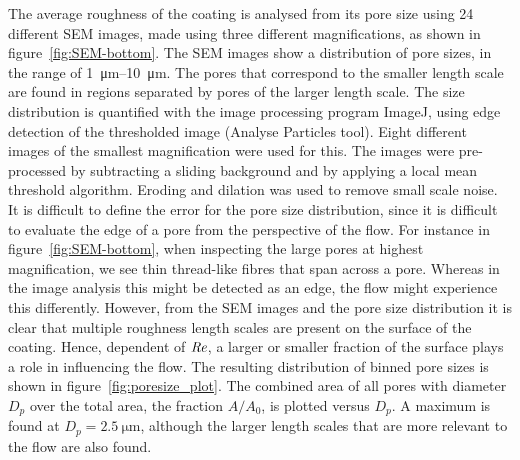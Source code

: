 The average roughness of the coating is analysed from its pore size using 24 different SEM images, made using three different magnifications, as shown in figure~\ref{fig:SEM-bottom}.  The SEM images show a distribution of pore sizes, in the range of \SIrange{1}{10}{\um}. The pores that correspond to the smaller length scale are found in regions separated by pores of the larger length scale. The size distribution is quantified with the image processing program ImageJ, using edge detection of the thresholded image (Analyse Particles tool). Eight different images of the smallest magnification were used for this. The images were pre-processed by subtracting a sliding background and by applying a local mean threshold algorithm. Eroding and dilation was used to remove small scale noise. It is difficult to define the error for the pore size distribution, since it is difficult to evaluate the edge of a pore from the perspective of the flow. For instance in figure~\ref{fig:SEM-bottom}, when inspecting the large pores at highest magnification, we see thin thread-like fibres that span across a pore. Whereas in the image analysis this might be detected as an edge, the flow might experience this differently. However, from the SEM images and the pore size distribution it is clear that multiple roughness length scales are present on the surface of the coating. Hence, dependent of $\mbox{\textit{Re}}$, a larger or smaller fraction of the surface plays a role in influencing the flow. The resulting distribution of binned pore sizes is shown in figure~\ref{fig:poresize_plot}. The combined area of all pores with diameter $D_p$ over the total area, the fraction $A/A_0$, is plotted versus $D_p$. A maximum is found at $D_p = \SI{2.5}{\um}$, although the larger length scales that are more relevant to the flow are also found.


